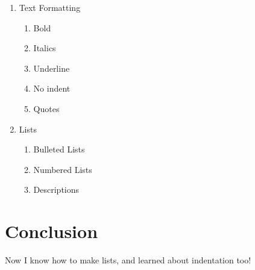 \documentclass{article}
\begin{document}
    \begin{enumerate}
        \item Text Formatting
        \begin{enumerate}
            \item Bold
            \item Italics
            \item Underline
            \item No indent
            \item Quotes
        \end{enumerate}
        \item Lists
        \begin{enumerate}
            \item Bulleted Lists
            \item Numbered Lists
            \item Descriptions
        \end{enumerate}
    \end{enumerate}

    \section{Conclusion}

    Now I know how to make lists, and learned about indentation too!
\end{document}

